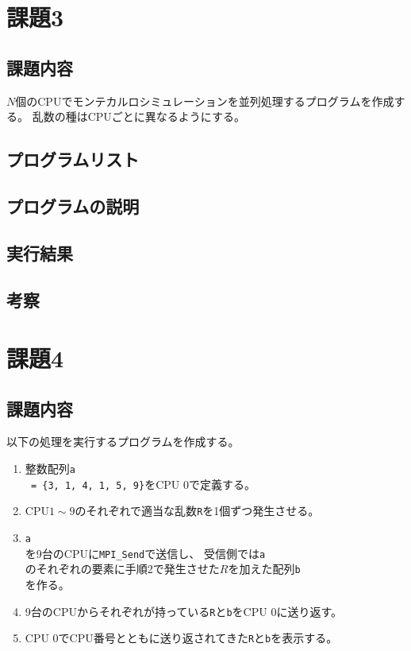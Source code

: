 \documentclass[a4j,titlepage]{jsarticle}
\begin{document}
\section{課題3}
\subsection{課題内容}
$N$個のCPUでモンテカルロシミュレーションを並列処理するプログラムを作成する。
乱数の種はCPUごとに異なるようにする。

\subsection{プログラムリスト}

\subsection{プログラムの説明}

\subsection{実行結果}

\subsection{考察}


\section{課題4}
\subsection{課題内容}
以下の処理を実行するプログラムを作成する。

\begin{enumerate}
  \item 整数配列\texttt{a\[\] = \{3, 1, 4, 1, 5, 9\}}をCPU 0で定義する。
  \item CPU$1 \sim 9$のそれぞれで適当な乱数\texttt{R}を1個ずつ発生させる。
  \item \texttt{a\[\]}を9台のCPUに\texttt{MPI\_Send}で送信し、
        受信側では\texttt{a\[\]}のそれぞれの要素に手順2で発生させた$R$を加えた配列\texttt{b\[\]}を作る。
  \item 9台のCPUからそれぞれが持っている\texttt{R}と\texttt{b}をCPU 0に送り返す。
  \item CPU 0でCPU番号とともに送り返されてきた\texttt{R}と\texttt{b}を表示する。
\end{enumerate}
\end{document}
